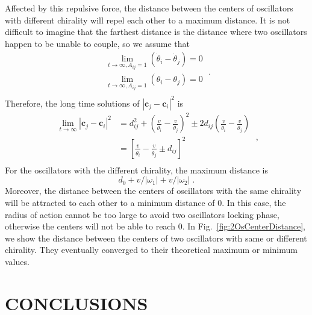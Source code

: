 \documentclass[%
 aip,
 amsmath,amssymb,
 reprint,%
]{revtex4-1}
\begin{document}
Affected by this repulsive force, the distance between the centers of oscillators with different chirality will repel each other to a maximum distance. It is not difficult to imagine that the farthest distance is the distance where two oscillators happen to be unable to couple, so we assume that 
\begin{equation}
    \begin{array}{c}
        \lim_{t\rightarrow \infty ,A_{ij}=1} \left( \dot{\theta}_i-\dot{\theta}_j \right) =0\\
        \lim_{t\rightarrow \infty ,A_{ij}=1} \left( \theta _i-\theta _j \right) =0\\
    \end{array}\;.
\end{equation} 
Therefore, the long time solutions of $\left| \mathbf{c}_j-\mathbf{c}_i \right|^2$ is 
\begin{equation}
    \begin{aligned}
        \lim_{t\rightarrow \infty} \left| \mathbf{c}_j-\mathbf{c}_i \right|^2&=d_{ij}^{2}+\left( \frac{v}{\dot{\theta}_i}-\frac{v}{\dot{\theta}_j} \right) ^2\pm 2d_{ij}\left( \frac{v}{\dot{\theta}_i}-\frac{v}{\dot{\theta}_j} \right)\\
        &=\left[ \frac{v}{\dot{\theta}_i}-\frac{v}{\dot{\theta}_j}\pm d_{ij} \right] ^2\\
    \end{aligned}\;,
\end{equation}
For the oscillators with the different chirality, the maximum distance is 
\begin{equation}\label{eq:maxDistance}
    d_0+v/\left| \omega _1 \right|+v/\left| \omega _2 \right|\;.
\end{equation} 
Moreover, the distance between the centers of oscillators with the same chirality will be attracted to each other to a minimum distance of $0$. In this case, the radius of action cannot be too large to avoid two oscillators locking phase, otherwise the centers will not be able to reach $0$.
In Fig.~\ref{fig:2OsCenterDistance}, we show the distance between the centers of two oscillators with same or different chirality. They eventually converged to their theoretical maximum or minimum values.

\section{\label{sec:conclusions}CONCLUSIONS}
\end{document}
